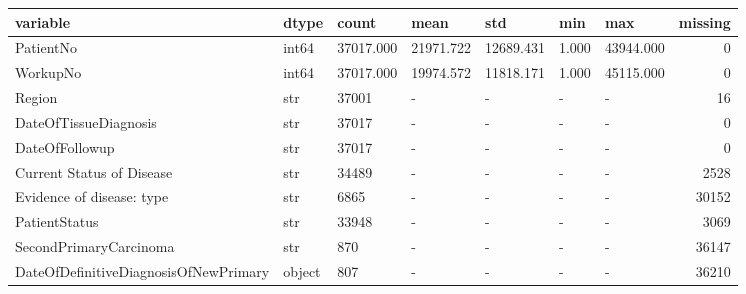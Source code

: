 \begin{tabular}{lllllllr}
\toprule
variable & dtype & count & mean & std & min & max & missing \\
\midrule
PatientNo & int64 & 37017.000 & 21971.722 & 12689.431 & 1.000 & 43944.000 & 0 \\
WorkupNo & int64 & 37017.000 & 19974.572 & 11818.171 & 1.000 & 45115.000 & 0 \\
Region & str & 37001 & - & - & - & - & 16 \\
DateOfTissueDiagnosis & str & 37017 & - & - & - & - & 0 \\
DateOfFollowup & str & 37017 & - & - & - & - & 0 \\
Current Status of Disease & str & 34489 & - & - & - & - & 2528 \\
Evidence of disease: type & str & 6865 & - & - & - & - & 30152 \\
PatientStatus & str & 33948 & - & - & - & - & 3069 \\
SecondPrimaryCarcinoma & str & 870 & - & - & - & - & 36147 \\
DateOfDefinitiveDiagnosisOfNewPrimary & object & 807 & - & - & - & - & 36210 \\
\bottomrule
\end{tabular}
